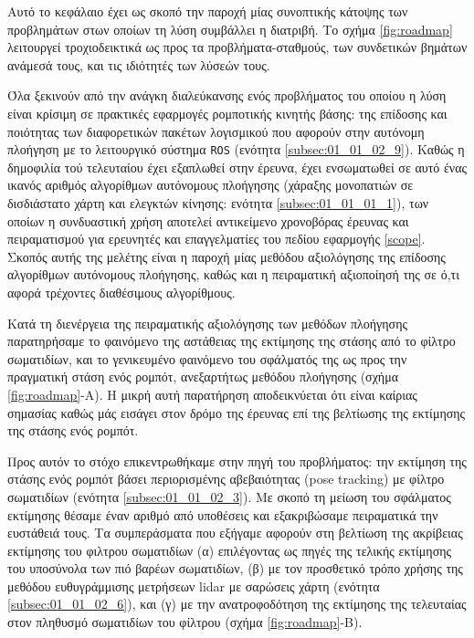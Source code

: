 Αυτό το κεφάλαιο έχει ως σκοπό την παροχή μίας συνοπτικής κάτοψης των
προβλημάτων στων οποίων τη λύση συμβάλλει η διατριβή. Το σχήμα
\ref{fig:roadmap} λειτουργεί τροχιοδεικτικά ως προς τα προβλήματα-σταθμούς,
των συνδετικών βημάτων ανάμεσά τους, και τις ιδιότητές των λύσεών τους.


Όλα ξεκινούν από την ανάγκη διαλεύκανσης ενός προβλήματος του οποίου η λύση
είναι κρίσιμη σε πρακτικές εφαρμογές ρομποτικής κινητής βάσης: της επίδοσης και
ποιότητας των διαφορετικών πακέτων λογισμικού που αφορούν στην αυτόνομη
πλοήγηση με το λειτουργικό σύστημα \texttt{ROS} (ενότητα
\ref{subsec:01_01_02_9}).  Καθώς η δημοφιλία τού τελευταίου έχει εξαπλωθεί στην
έρευνα, έχει ενσωματωθεί σε αυτό ένας ικανός αριθμός αλγορίθμων αυτόνομους
πλοήγησης (χάραξης μονοπατιών σε δισδιάστατο χάρτη και ελεγκτών κίνησης:
ενότητα \ref{subsec:01_01_01_1}), των οποίων η συνδυαστική χρήση αποτελεί
αντικείμενο χρονοβόρας έρευνας και πειραματισμού για ερευνητές και
επαγγελματίες του πεδίου εφαρμογής \ref{scope}.  Σκοπός αυτής της μελέτης είναι
η παροχή μίας μεθόδου αξιολόγησης της επίδοσης αλγορίθμων αυτόνομους πλοήγησης,
καθώς και η πειραματική αξιοποίησή της σε ό,τι αφορά τρέχοντες διαθέσιμους
αλγορίθμους.

Κατά τη διενέργεια της πειραματικής αξιολόγησης των μεθόδων πλοήγησης
παρατηρήσαμε το φαινόμενο της αστάθειας της εκτίμησης της στάσης από το φίλτρο
σωματιδίων, και το γενικευμένο φαινόμενο του σφάλματός της ως προς την
πραγματική στάση ενός ρομπότ, ανεξαρτήτως μεθόδου πλοήγησης (σχήμα
\ref{fig:roadmap}-Α). Η μικρή αυτή παρατήρηση αποδεικνύεται ότι είναι καίριας
σημασίας καθώς μάς εισάγει στον δρόμο της έρευνας επί της βελτίωσης της
εκτίμησης της στάσης ενός ρομπότ.


Προς αυτόν το στόχο επικεντρωθήκαμε στην πηγή του προβλήματος: την εκτίμηση της
στάσης ενός ρομπότ βάσει περιορισμένης αβεβαιότητας (pose tracking) με φίλτρο
σωματιδίων (ενότητα \ref{subsec:01_01_02_3}). Με σκοπό τη μείωση του
σφάλματος εκτίμησης θέσαμε έναν αριθμό από υποθέσεις και εξακριβώσαμε
πειραματικά την ευστάθειά τους. Τα συμπεράσματα που εξήγαμε αφορούν στη
βελτίωση της ακρίβειας εκτίμησης του φιλτρου σωματιδίων (α) επιλέγοντας ως
πηγές της τελικής εκτίμησης του υποσύνολα των πιό βαρέων σωματιδίων, (β) με τον
προσθετικό τρόπο χρήσης της μεθόδου ευθυγράμμισης μετρήσεων lidar με σαρώσεις
χάρτη (ενότητα \ref{subsec:01_01_02_6}), και (γ) με την ανατροφοδότηση της
εκτίμησης της τελευταίας στον πληθυσμό σωματιδίων του φίλτρου (σχήμα
\ref{fig:roadmap}-Β).


